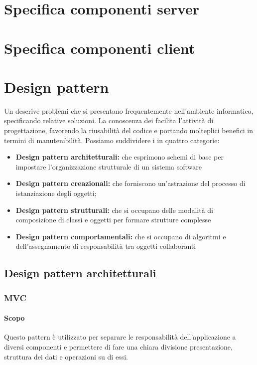 \documentclass[12pt,a4paper]{article}
\begin{document}
\newpage
\section{Specifica componenti server}
%

\newpage

\section{Specifica componenti client}
%

\newpage
\section{Design pattern}
Un  descrive problemi che si presentano frequentemente nell'ambiente informatico, specificando relative soluzioni. La conoscenza dei  facilita l’attività di progettazione, favorendo la riusabilità del codice e portando molteplici benefici in termini di manutenibilità. Possiamo suddividere i  in
quattro categorie:

\begin{itemize}
	\item \textbf{Design pattern architetturali:} che esprimono schemi di base per impostare l’organizzazione strutturale di un sistema software
	\item \textbf{Design pattern creazionali:} che forniscono un’astrazione del processo di istanziazione degli oggetti;
	\item \textbf{Design pattern strutturali:} che si occupano delle modalità di composizione di classi e oggetti per formare strutture complesse
	\item \textbf{Design pattern comportamentali:} che si occupano di algoritmi e dell’assegnamento di responsabilità tra oggetti collaboranti
\end{itemize}

\subsection{Design pattern architetturali}
\subsubsection{MVC}
\paragraph{Scopo}
Questo pattern è utilizzato per separare le responsabilità dell’applicazione a diversi componenti e permettere di fare una chiara divisione presentazione, struttura dei dati e operazioni su di essi.
\end{document}
